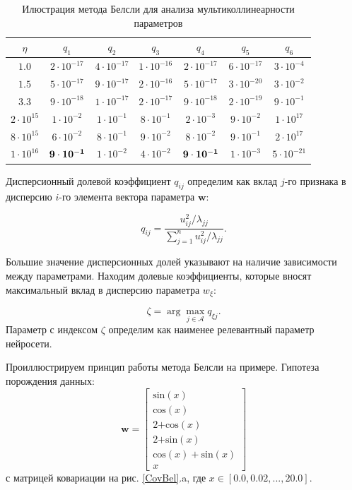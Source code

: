 \begin{table}[h]
\begin{center}
\caption{Илюстрация метода Белсли для анализа мультиколлинеарности параметров}
\begin{tabular}{|c|cccccc|}
\hline
$\eta$ & $q_1$& $q_2$& $q_3$& $q_4$& $q_5$& $q_6$\\
\hline
$1.0$ &  $2\cdot 10^{-17}$ &  $4\cdot 10^{-17}$ &  $1\cdot 10^{-16}$ &  $2\cdot 10^{-17}$ &  $6\cdot 10^{-17}$&  $3\cdot 10^{-4}$ \\
\hline
$1.5$ &  $5\cdot 10^{-17}$ &  $9\cdot 10^{-17}$ &  $2\cdot 10^{-16}$ &  $5\cdot 10^{-17}$ &  $3\cdot 10^{-20}$ &  $3\cdot 10^{-2}$ \\
\hline
$3.3$ &  $9\cdot 10^{-18}$ &  $1\cdot 10^{-17}$ &  $2\cdot 10^{-17}$ &  $9\cdot 10^{-18}$ &  $2\cdot 10^{-19}$ &  $9\cdot 10^{-1}$ \\
\hline
$2\cdot 10^{15}$ &  $1\cdot 10^{-2}$ &  $1\cdot 10^{-1}$ &  $8\cdot 10^{-1}$ &  $2\cdot 10^{-3}$ &  $9\cdot 10^{-2}$ &  $1\cdot 10^{17}$ \\ 
\hline
$8\cdot 10^{15}$ &  $6\cdot 10^{-2}$ &  $8\cdot 10^{-1}$ &  $9\cdot 10^{-2}$ &  $8\cdot 10^{-2}$ &  $9\cdot 10^{-1}$ & $ 2\cdot 10^{17} $\\
\hline
$1\cdot 10^{16}$ &  $\bf9\cdot 10^{-1}$ &  $1\cdot 10^{-2}$& $ 4\cdot 10^{-2}$&  $\bf9\cdot 10^{-1}$ &  $1\cdot 10^{-3}$ & $ 5\cdot 10^{-21}$ \\
\hline
\end{tabular}
\label{CovBelTable}
\end{center}
\end{table}

Дисперсионный долевой коэффициент $q_{ij}$ определим как вклад $j$-го признака в дисперсию $i$-го элемента вектора параметра $\textbf{w}$:

\[
\label{4.3}
q_{ij} = \frac{u^2_{ij}/\lambda_{jj}}{\sum^n_{j=1}{u^2_{ij}/\lambda_{jj}}}.
\]

Большие значение дисперсионных долей указывают на наличие зависимости между параметрами. Находим долевые коэффициенты, которые вносят максимальный вклад в дисперсию параметра $w_\xi$:

\[
\label{4.4}
\zeta = \arg\max_{j\in \mathcal{A}}{q_{\xi j}}.
\]
Параметр с индексом $\zeta$ определим как наименее релевантный параметр нейросети. 

Проиллюстрируем принцип работы метода Белсли на примере. Гипотеза порождения данных: 
\[
\textbf{w} = \begin{bmatrix}
\text{sin}(x)\\
\text{cos}(x)\\
\text{2+cos}(x)\\
\text{2+sin}(x)\\
\text{cos}(x) + \text{sin}(x)\\
x
\end{bmatrix}
\]
с матрицей ковариации на рис. \ref{CovBel}.a, где $x \in [0.0, 0.02, ..., 20.0]$.


